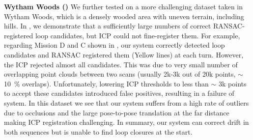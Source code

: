 \noindent \textbf{Wytham Woods (\textbf{})}\hspace{0.5em} We further tested on a more challenging dataset taken in Wytham Woods, which is a densely wooded area with uneven terrain, including hills. In , we demonstrate that a sufficiently large numbers of correct RANSAC-registered loop candidates, but ICP could not fine-register them. For example, regarding Mission D and C shown in , our system correctly detected loop candidates and RANSAC registered them (Yellow lines) at each turn. However, the ICP rejected almost all candidates. This was due to very small number of overlapping point clouds between two scans (usually 2k-3k out of 20k points, $\sim$\SI{10}{\percent} overlaps). Unfortunately, lowering ICP thresholds to less than $\sim$ 3k points to accept these candidates introduced false positives, resulting in a failure of system. In this dataset we see that our system suffers from a high rate of outliers due to occlusions and the large pose-to-pose translation at the far distance making ICP registration challenging. In summary, our system can correct drift in both sequences but is unable to find loop closures at the start.
